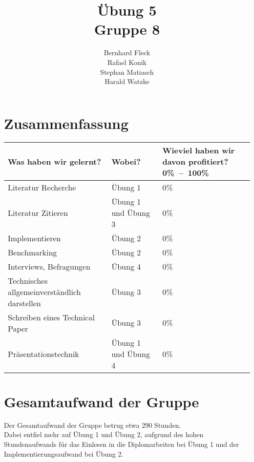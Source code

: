 \documentclass[11pt]{article} %
\title{Übung 5\\Gruppe 8}
\author{Bernhard Fleck\\Rafael Konik\\Stephan Matiasch\\Harald Watzke}
\begin{document}
\maketitle

\section{Zusammenfassung}

\begin{table}[!ht]
   \begin{center}
	\begin{tabular}{p{6cm}lm{3cm}}
    \toprule
	\textbf{Was haben wir gelernt?} & \textbf{Wobei?} & \textbf{Wieviel haben wir davon profitiert? 0\%~--~100\%} \tabularnewline
    \midrule
	 Literatur Recherche & Übung 1 & 0\% \tabularnewline
     \addlinespace
 	 Literatur Zitieren & Übung 1 und Übung 3 &0\% \tabularnewline
     \addlinespace
	 Implementieren & Übung 2 & 0\% \tabularnewline
     \addlinespace
	 Benchmarking & Übung 2 & 0\% \tabularnewline
     \addlinespace
	 Interviews, Befragungen & Übung 4 & 0\% \tabularnewline
     \addlinespace
	 Technisches all\-ge\-mein\-ver\-ständ\-lich darstellen & Übung 3 & 0\% \tabularnewline
     \addlinespace
	 Schreiben eines Technical Paper & Übung 3 & 0\% \tabularnewline
     \addlinespace
	 Präsentationstechnik & Übung 1 und Übung 4 & 0\% \tabularnewline
     \bottomrule
	\end{tabular}
   \end{center}
\end{table}

\section{Gesamtaufwand der Gruppe}

Der Gesamtaufwand der Gruppe betrug etwa 290 Stunden.\\ Dabei entfiel mehr auf Übung 1 und Übung 2, aufgrund des hohen Stundenaufwands für das Einlesen in die Diplomarbeiten bei Übung 1 und der Implementierungsaufwand bei Übung 2.
\end{document}
